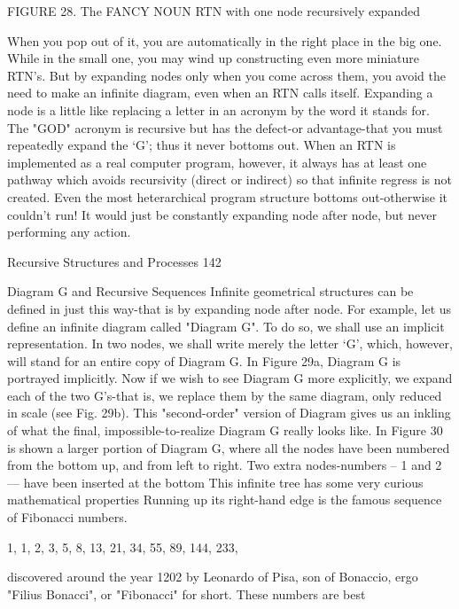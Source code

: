       FIGURE 28. The FANCY NOUN RTN with one node recursively expanded

When you pop out of it, you are automatically in the right place in the big one. While in
the small one, you may wind up constructing even more miniature RTN's. But by
expanding nodes only when you come across them, you avoid the need to make an
infinite diagram, even when an RTN calls itself.
        Expanding a node is a little like replacing a letter in an acronym by the word it
stands for. The "GOD" acronym is recursive but has the defect-or advantage-that you
must repeatedly expand the `G'; thus it never bottoms out. When an RTN is implemented
as a real computer program, however, it always has at least one pathway which avoids
recursivity (direct or indirect) so that infinite regress is not created. Even the most
heterarchical program structure bottoms out-otherwise it couldn't run! It would just be
constantly expanding node after node, but never performing any action.




Recursive Structures and Processes                                                   142

                      Diagram G and Recursive Sequences
        Infinite geometrical structures can be defined in just this way-that is by expanding
node after node. For example, let us define an infinite diagram called "Diagram G". To
do so, we shall use an implicit representation. In two nodes, we shall write merely the
letter `G', which, however, will stand for an entire copy of Diagram G. In Figure 29a,
Diagram G is portrayed implicitly. Now if we wish to see Diagram G more explicitly, we
expand each of the two G's-that is, we replace them by the same diagram, only reduced
in scale (see Fig. 29b). This "second-order" version of Diagram gives us an inkling of
what the final, impossible-to-realize Diagram G really looks like. In Figure 30 is shown a
larger portion of Diagram G, where all the nodes have been numbered from the bottom
up, and from left to right. Two extra nodes-numbers -- 1 and 2--- have been inserted at
the bottom
        This infinite tree has some very curious mathematical properties Running up its
right-hand edge is the famous sequence of Fibonacci numbers.

       1,   1, 2, 3, 5, 8, 13, 21, 34, 55, 89,           144,    233,

discovered around the year 1202 by Leonardo of Pisa, son of Bonaccio, ergo "Filius
Bonacci", or "Fibonacci" for short. These numbers are best

